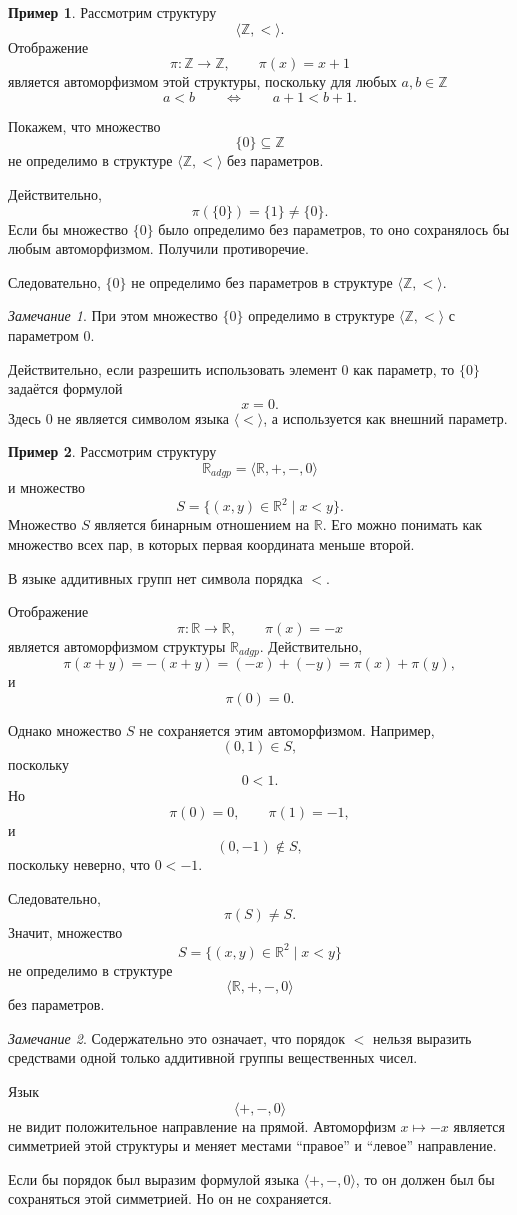 \documentclass[12pt,a4paper,oneside,openany]{book}
\theoremstyle{definition}
\newtheorem{example}{Пример}[chapter]
\theoremstyle{plain}
\theoremstyle{remark}
\newtheorem{remark}{Замечание}[chapter]
\begin{document}
\begin{example}
Рассмотрим структуру
\[
\langle\mathbb Z,<\rangle.
\]
Отображение
\[
\pi:\mathbb Z\to\mathbb Z,
\qquad
\pi(x)=x+1
\]
является автоморфизмом этой структуры, поскольку для любых $a,b\in\mathbb Z$
\[
a<b
\qquad
\Longleftrightarrow
\qquad
a+1<b+1.
\]

Покажем, что множество
\[
\{0\}\subseteq\mathbb Z
\]
не определимо в структуре $\langle\mathbb Z,<\rangle$ без параметров.

Действительно,
\[
\pi(\{0\})=\{1\}\ne\{0\}.
\]
Если бы множество $\{0\}$ было определимо без параметров, то оно сохранялось бы любым автоморфизмом. Получили противоречие.

Следовательно, $\{0\}$ не определимо без параметров в структуре $\langle\mathbb Z,<\rangle$.
\end{example}

\begin{remark}
При этом множество $\{0\}$ определимо в структуре $\langle\mathbb Z,<\rangle$ с параметром $0$.

Действительно, если разрешить использовать элемент $0$ как параметр, то $\{0\}$ задаётся формулой
\[
x=0.
\]
Здесь $0$ не является символом языка $\langle <\rangle$, а используется как внешний параметр.
\end{remark}

\begin{example}
Рассмотрим структуру
\[
\mathbb R_{adgp}
=
\langle\mathbb R,+,-,0\rangle
\]
и множество
\[
S=\{(x,y)\in\mathbb R^2\mid x<y\}.
\]
Множество $S$ является бинарным отношением на $\mathbb R$. Его можно понимать как множество всех пар, в которых первая координата меньше второй.

В языке аддитивных групп нет символа порядка $<$.

Отображение
\[
\pi:\mathbb R\to\mathbb R,
\qquad
\pi(x)=-x
\]
является автоморфизмом структуры $\mathbb R_{adgp}$. Действительно,
\[
\pi(x+y)=-(x+y)=(-x)+(-y)=\pi(x)+\pi(y),
\]
и
\[
\pi(0)=0.
\]

Однако множество $S$ не сохраняется этим автоморфизмом. Например,
\[
(0,1)\in S,
\]
поскольку
\[
0<1.
\]
Но
\[
\pi(0)=0,
\qquad
\pi(1)=-1,
\]
и
\[
(0,-1)\notin S,
\]
поскольку неверно, что $0<-1$.

Следовательно,
\[
\pi(S)\ne S.
\]
Значит, множество
\[
S=\{(x,y)\in\mathbb R^2\mid x<y\}
\]
не определимо в структуре
\[
\langle\mathbb R,+,-,0\rangle
\]
без параметров.
\end{example}

\begin{remark}
Содержательно это означает, что порядок $<$ нельзя выразить средствами одной только аддитивной группы вещественных чисел.

Язык
\[
\langle +,-,0\rangle
\]
не видит положительное направление на прямой. Автоморфизм $x\mapsto -x$ является симметрией этой структуры и меняет местами ``правое'' и ``левое'' направление.

Если бы порядок был выразим формулой языка $\langle +,-,0\rangle$, то он должен был бы сохраняться этой симметрией. Но он не сохраняется.
\end{remark}
\end{document}
